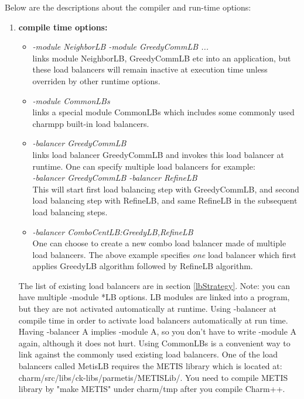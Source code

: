 Below are the descriptions about the compiler and run-time options:

\begin{enumerate}
\item {\bf compile time options:}

\begin{itemize}
\item {\em -module NeighborLB -module GreedyCommLB ...}  \\
  links module NeighborLB, GreedyCommLB etc into an application, but these 
load balancers will remain inactive at execution time unless overriden by 
other runtime options.
\item {\em -module CommonLBs} \\
  links a special module CommonLBs which includes some commonly used charmpp{}
built-in load balancers.
\item {\em -balancer GreedyCommLB} \\
  links load balancer GreedyCommLB and invokes this load balancer at runtime. One can specify multiple load balancers for example: \\
   {\em -balancer GreedyCommLB -balancer RefineLB}   \\
   This will start first load balancing step with GreedyCommLB, and second load balancing step with RefineLB, and same RefineLB in the subsequent load balancing steps.
\item {\em -balancer ComboCentLB:GreedyLB,RefineLB}  \\
   One can choose to create a new combo load balancer made of multiple load balancers. The above example specifies {\em one} load balancer which first applies GreedyLB algorithm followed by RefineLB algorithm.
\end{itemize}

The list of existing load balancers are in section \ref{lbStrategy}. Note: you
can have multiple -module *LB options. LB modules are linked into a program,
but they are not activated automatically at runtime.  Using -balancer at
compile time in order to activate load balancers automatically at run time.
Having -balancer A implies -module A, so you don't have to write -module A
again, although it does not hurt.  Using CommonLBs is a convenient way to link
against the commonly used existing load balancers.  One of the load balancers
called MetisLB requires the METIS library which is located at:
charm/src/libs/ck-libs/parmetis/METISLib/.  You need to compile METIS library
by "make METIS" under charm/tmp after you compile Charm++.


\end{enumerate}
